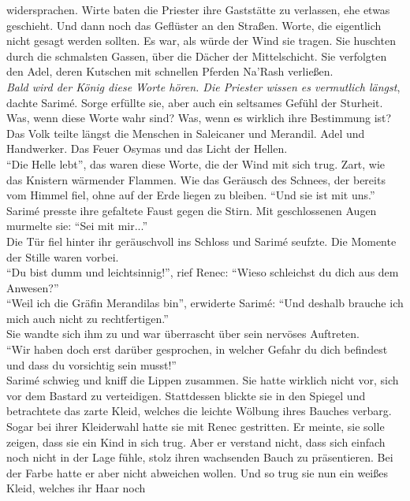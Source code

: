 widersprachen. Wirte baten die Priester ihre Gaststätte zu verlassen, ehe etwas geschieht. Und dann 
noch das Geflüster an den Straßen. Worte, die eigentlich nicht gesagt werden sollten. Es war, als 
würde der Wind sie tragen. Sie huschten durch die schmalsten Gassen, über die Dächer der 
Mittelschicht. Sie verfolgten den Adel, deren Kutschen mit schnellen Pferden Na'Rash verließen.\\
\textit{Bald wird der König diese Worte hören. Die Priester wissen es vermutlich längst}, dachte 
Sarimé. Sorge erfüllte sie, aber auch ein seltsames Gefühl der Sturheit. Was, wenn diese Worte wahr 
sind? Was, wenn es wirklich ihre Bestimmung ist?\\
Das Volk teilte längst die Menschen in Saleicaner und Merandil. Adel und Handwerker. Das Feuer 
Osymas und das Licht der Hellen.\\
``Die Helle lebt'', das waren diese Worte, die der Wind mit sich trug. Zart, wie das Knistern 
wärmender Flammen. Wie das Geräusch des Schnees, der bereits vom Himmel fiel, ohne auf der 
Erde liegen zu bleiben. ``Und sie ist mit uns.''\\
Sarimé presste ihre gefaltete Faust gegen die Stirn. Mit geschlossenen Augen murmelte sie: ``Sei 
mit mir...''\\
Die Tür fiel hinter ihr geräuschvoll ins Schloss und Sarimé seufzte. Die Momente der Stille waren 
vorbei.\\
``Du bist dumm und leichtsinnig!'', rief Renec: ``Wieso schleichst du dich aus dem Anwesen?''\\
``Weil ich die Gräfin Merandilas bin'', erwiderte Sarimé: ``Und deshalb brauche ich mich auch nicht 
zu rechtfertigen.''\\
Sie wandte sich ihm zu und war überrascht über sein nervöses Auftreten.\\
``Wir haben doch erst darüber gesprochen, in welcher Gefahr du dich befindest und dass du 
vorsichtig sein musst!''\\
Sarimé schwieg und kniff die Lippen zusammen. Sie hatte wirklich nicht vor, sich vor dem Bastard zu 
verteidigen. Stattdessen blickte sie in den Spiegel und betrachtete das zarte Kleid, welches die 
leichte Wölbung ihres Bauches verbarg. Sogar bei ihrer Kleiderwahl hatte sie mit Renec gestritten. 
Er meinte, sie solle zeigen, dass sie ein Kind in sich trug. Aber er verstand nicht, dass sich 
einfach noch nicht in der Lage fühle, stolz ihren wachsenden Bauch zu präsentieren. Bei der Farbe 
hatte er aber nicht abweichen wollen. Und so trug sie nun ein weißes Kleid, welches ihr Haar noch 
